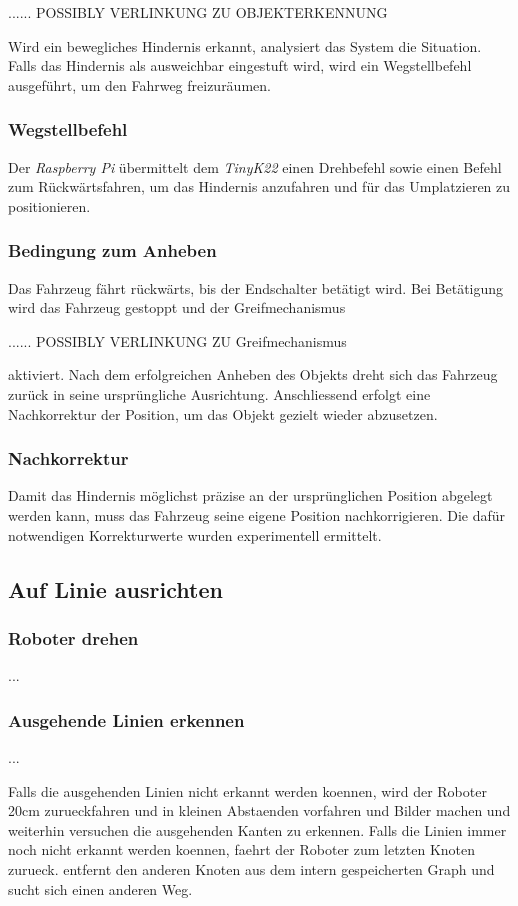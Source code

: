 ...... POSSIBLY VERLINKUNG ZU OBJEKTERKENNUNG

Wird ein bewegliches Hindernis erkannt, analysiert das System die Situation. Falls das Hindernis als ausweichbar eingestuft wird, wird ein Wegstellbefehl ausgeführt, um den Fahrweg freizuräumen.

\subsubsection{Wegstellbefehl}
Der \textit{Raspberry Pi} übermittelt dem \textit{TinyK22} einen Drehbefehl sowie einen Befehl zum Rückwärtsfahren, um das Hindernis anzufahren und für das Umplatzieren zu positionieren.

\subsubsection{Bedingung zum Anheben}
Das Fahrzeug fährt rückwärts, bis der Endschalter betätigt wird. Bei Betätigung wird das Fahrzeug gestoppt und der Greifmechanismus

...... POSSIBLY VERLINKUNG ZU Greifmechanismus

aktiviert. Nach dem erfolgreichen Anheben des Objekts dreht sich das Fahrzeug zurück in seine ursprüngliche Ausrichtung. Anschliessend erfolgt eine Nachkorrektur der Position, um das Objekt gezielt wieder abzusetzen.

\subsubsection{Nachkorrektur}
Damit das Hindernis möglichst präzise an der ursprünglichen Position abgelegt werden kann, muss das Fahrzeug seine eigene Position nachkorrigieren. Die dafür notwendigen Korrekturwerte wurden experimentell ermittelt.


\newpage
\subsection{Auf Linie ausrichten}

\subsubsection{Roboter drehen}

...

\subsubsection{Ausgehende Linien erkennen}
\label{outgoing-lines}

...

Falls die ausgehenden Linien nicht erkannt werden koennen, wird der Roboter 20cm zurueckfahren und in kleinen Abstaenden vorfahren und Bilder machen und weiterhin versuchen die ausgehenden Kanten zu erkennen. Falls die Linien immer noch nicht erkannt werden koennen, faehrt der Roboter zum letzten Knoten zurueck. entfernt den anderen Knoten aus dem intern gespeicherten Graph und sucht sich einen anderen Weg.